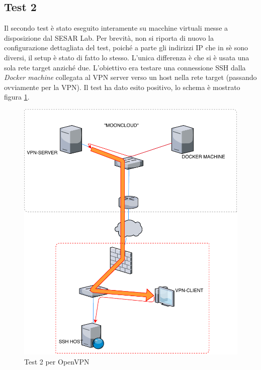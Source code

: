 \subsection{Test 2}
Il secondo test è stato eseguito interamente su macchine virtuali messe
a disposizione dal SESAR Lab. Per brevità, non si riporta di nuovo la
configurazione dettagliata del test, poiché a parte gli indirizzi IP
che in sè sono diversi, il setup è stato di fatto lo stesso. L'unica
differenza è che si è usata una sola rete target anziché due.
L'obiettivo era testare una connessione SSH dalla \textit{Docker machine}
collegata al VPN server verso un host nella rete target (passando
ovviamente per la VPN).
Il test ha dato esito positivo, lo schema è mostrato figura \ref{fig:openvpn-test2}.
\begin{figure}
	\includegraphics[scale=0.55]{img/openvpn_test2}
	\caption{Test 2 per OpenVPN}
	\label{fig:openvpn-test2}
\end{figure}